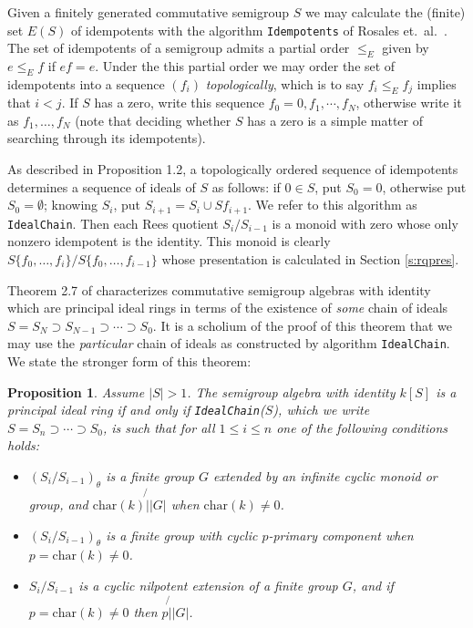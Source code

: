 \documentclass[12pt]{article}
\def\char{{\mbox{char}}}
\newtheorem{proposition}{\bf Proposition}
\begin{document}
Given a finitely generated commutative semigroup $S$ we
may calculate the (finite) set $E(S)$ of idempotents with the algorithm
{\tt Idempotents} of Rosales et.~al.~\cite{pRGG99}. 
The set of idempotents of a semigroup admits a partial order
$\leq_E$ given by $e \leq_E f$ if $ef = e$.
Under the this partial order we may order the set of idempotents
into a sequence $(f_i)$ {\em topologically}, which is to 
say $f_i \leq_E f_j$ implies that $i < j$. 
If $S$ has a zero, write this sequence $f_0 = 0, f_1, \cdots, f_N$,
otherwise write it as $f_1, \ldots, f_N$
(note that deciding whether $S$ has a zero is a simple matter of 
searching through its idempotents).

As described in \cite{pDJW91} Proposition 1.2,  a  topologically 
ordered sequence of idempotents determines a sequence of ideals
of $S$ as follows:
if $0 \in S$, put $S_0 = {0}$, otherwise put $S_0 = \emptyset$; 
knowing $S_i$, put $S_{i+1} = S_i \cup S f_{i+1}$. We refer to this
algorithm as {\tt IdealChain}.  Then
each Rees quotient $S_i/S_{i-1}$ is a monoid with zero whose only
nonzero idempotent is the identity. This monoid is clearly
$S\{f_0, \ldots, f_i\} / S\{f_0, \ldots, f_{i-1}\}$ whose 
presentation is calculated in Section \ref{s:rqpres}.
 
Theorem 2.7 of \cite{pDJW91} characterizes commutative semigroup
algebras with identity 
which are principal ideal rings  in terms of the existence of 
{\em some} chain of ideals $S = S_N \supset S_{N-1} 
\supset \cdots \supset S_0$. 
It is a scholium of the proof of this theorem that 
we may use the {\em particular} chain of ideals as constructed by
algorithm  {\tt IdealChain}. We state the stronger form of this 
theorem:

\begin{proposition}\label{p:djwthm}
Assume $|S| > 1$. The semigroup algebra with identity $k[S]$ is a
principal ideal ring if and only if {\tt IdealChain}($S$),
which we write $S=S_n \supset \cdots \supset S_0$, is
such that for all $1 \leq i \leq n$ one of the following conditions
holds:
\begin{itemize}
\item[(i)] 
$(S_i/ S_{i-1})_\theta$ is a finite group $G$ extended by an
infinite cyclic monoid or group, and $\char(k) \not{|} |G|$ when
$\char(k) \neq 0$. 
\item[(ii)] 
$(S_i/ S_{i-1})_\theta$ is a finite group with 
cyclic $p$-primary component when $p = \char(k) \neq 0$.
\item[(iii)] 
$S_i/ S_{i-1}$ is a cyclic nilpotent extension of a
finite group $G$, and if $p  = \char(k) \neq 0$ then
$p  \not{|} |G|$. 
\end{itemize}
\end{proposition}
\end{document}
